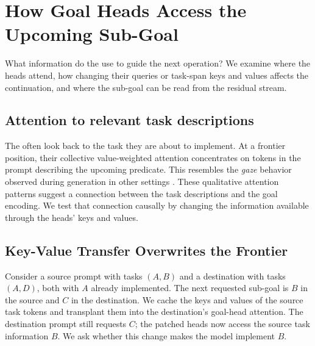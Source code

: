 \section{How Goal Heads Access the Upcoming Sub-Goal}
\label{sec:mechanism}
\label{sec:steer}
What information do the \goalheads use to guide the next operation? We examine where the heads attend, how changing their queries or task-span keys and values affects the continuation, and where the sub-goal can be read from the residual stream.

\subsection{Attention to relevant task descriptions}
\label{sec:mechanism:gaze}
The \goalheads often look back to the task they are about to implement. At a frontier position, their collective value-weighted attention concentrates on tokens in the prompt describing the upcoming predicate. This resembles the \emph{gaze} behavior observed during generation in other settings \citep{gandikota2026gaze}. These qualitative attention patterns suggest a connection between the task descriptions and the goal encoding. We test that connection causally by changing the information available through the heads' keys and values.

\subsection{Key-Value Transfer Overwrites the Frontier}
\label{sec:steer:transplant}
\label{sec:steer:crosslang}
\label{sec:steer:kv-transfer}


Consider a source prompt with tasks $(A,B)$ and a destination with tasks $(A,D)$, both with $A$ already implemented. The next requested sub-goal is $B$ in the source and $C$ in the destination. We cache the keys and values of the source task tokens and transplant them into the destination's goal-head attention. The destination prompt still requests $C$; the patched heads now access the source task information $B$. We ask whether this change makes the model implement $B$. 

